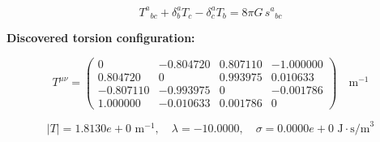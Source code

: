 
\begin{equation}
  T^a{}_{bc} + \delta^a_b T_c - \delta^a_c T_b = 8\pi G \, s^a{}_{bc}
\end{equation}

\textbf{Discovered torsion configuration:}

\begin{equation}
  T^{\mu\nu} = \begin{pmatrix}
    0 & -0.804720 & 0.807110 & -1.000000 \\
    0.804720 & 0 & 0.993975 & 0.010633 \\
    -0.807110 & -0.993975 & 0 & -0.001786 \\
    1.000000 & -0.010633 & 0.001786 & 0
  \end{pmatrix} \quad \text{m}^{-1}
\end{equation}

\begin{equation}
  |T| = 1.8130e+0 \text{ m}^{-1}, \quad
  \lambda = -10.0000, \quad
  \sigma = 0.0000e+0 \text{ J}\cdot\text{s/m}^3
\end{equation}